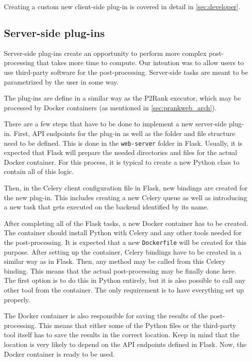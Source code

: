 Creating a custom new client-side plug-in is covered in detail in \cref{sec:developer}.

\subsection{Server-side plug-ins}
\label{subsec:server-side-plugins}

Server-side plug-ins create an opportunity to perform more complex post-processing that takes more time to compute. Our intention was to allow users to use third-party software for the post-processing. Server-side tasks are meant to be parametrized by the user in some way.

The plug-ins are define in a similar way as the P2Rank executor, which may be processed by Docker containers (as mentioned in \cref{sec:prankweb_arch}).

There are a few steps that have to be done to implement a new server-side plug-in. First, API endpoints for the plug-in as well as the folder and file structure need to be defined. This is done in the \texttt{web-server} folder in Flask. Usually, it is expected that Flask will prepare the needed directories and files for the actual Docker container. For this process, it is typical to create a new Python class to contain all of this logic.

Then, in the Celery client configuration file in Flask, new bindings are created for the new plug-in. This includes creating a new Celery queue as well as introducing a new task that gets executed on the backend identified by its name.

After completing all of the Flask tasks, a new Docker container has to be created. The container should install Python with Celery and any other tools needed for the post-processing. It is expected that a new \texttt{Dockerfile} will be created for this purpose. After setting up the container, Celery bindings have to be created in a similar way as in Flask. Then, any method may be called from this Celery binding. This means that the actual post-processing may be finally done here. The first option is to do this in Python entirely, but it is also possible to call any other tool from the container. The only requirement is to have everything set up properly. 

The Docker container is also responsible for saving the results of the post-processing. This means that either some of the Python files or the third-party tool itself has to save the results in the correct location. Keep in mind that the location is very likely to depend on the API endpoints defined in Flask. Now, the Docker container is ready to be used.


